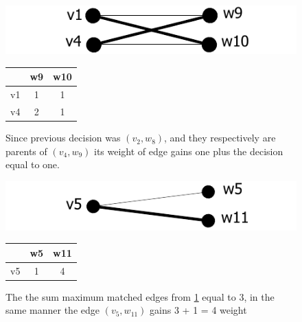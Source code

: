 \documentclass{report}
\begin{document}
\begin{figure}[h]
  \begin{minipage}[h]{0.60\linewidth}
    \centering
    \includegraphics[scale=0.95]{Figures/algorithms/TD/5ex.pdf}\\[0.1cm]
    
  \end{minipage}%
  \begin{minipage}[b]{0.30\linewidth}
    \centering
\begin{tabular}{|c|c|c|}
\hline
   & w9 & w10 \\ \hline
v1 & 1  & \cellcolor[gray]{0.9} 1   \\ \hline
v4 &  \cellcolor[gray]{0.9}2  & 1   \\ \hline
\end{tabular}
\end{minipage}
\caption{Since previous decision was $(v_{2},w_{8})$, and they respectively are parents of $(v_{4},w_{9})$ its weight of edge gains one plus the decision equal to one.}
\label{fig:ex5}
\end{figure}

\begin{figure}[h]
  \begin{minipage}[h]{0.60\linewidth}
    \centering
    \includegraphics[scale=0.95]{Figures/algorithms/TD/4ex.pdf}\\[0.1cm]
    
  \end{minipage}%
  \begin{minipage}[b]{0.30\linewidth}
    \centering
\begin{tabular}{|c|c|c|}
\hline
   & w5 & w11 \\ \hline
v5 & 1  &  \cellcolor[gray]{0.9} 4   \\ \hline
\end{tabular}
\end{minipage}
\caption{The the sum maximum matched edges from \ref{fig:ex5} equal to 3, in the same manner the edge $(v_{5},w_{11})$ gains 3 + 1 = 4 weight}
\label{fig:ex4}
\end{figure}
\end{document}
